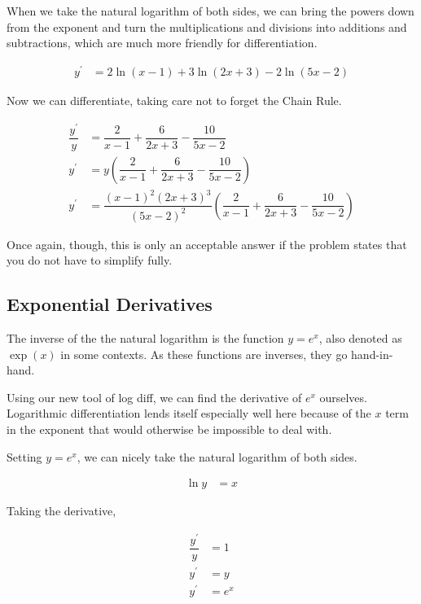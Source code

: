When we take the natural logarithm of both sides, we can bring the powers down from the exponent and turn the multiplications and divisions into additions and subtractions, which are much more friendly for differentiation.

\begin{align}
    y^\prime &= 2 \ln{\left( x - 1 \right)} + 3 \ln{\left( 2x + 3 \right)} - 2 \ln{\left( 5x - 2 \right)}
\end{align}

Now we can differentiate, taking care not to forget the Chain Rule.

\begin{align}
    \dfrac{y^\prime}{y} &= \dfrac{2}{x - 1} + \dfrac{6}{2x + 3} - \dfrac{10}{5x - 2} \\
    y^\prime &= y \left( \dfrac{2}{x - 1} + \dfrac{6}{2x + 3} - \dfrac{10}{5x - 2} \right) \\
    y^\prime &= \dfrac{\left( x - 1 \right)^2 \left( 2x + 3 \right)^3}{\left( 5x - 2 \right)^2} \left( \dfrac{2}{x - 1} + \dfrac{6}{2x + 3} - \dfrac{10}{5x - 2} \right)
\end{align}

Once again, though, this is only an acceptable answer if the problem states that you do not have to simplify fully.

\subsection{Exponential Derivatives}

The inverse of the the natural logarithm is the function \( y = e^x \), also denoted as \( \exp{\left( x \right)} \) in some contexts. As these functions are inverses, they go hand-in-hand.

Using our new tool of log diff, we can find the derivative of \( e^x \) ourselves. Logarithmic differentiation lends itself especially well here because of the \( x \) term in the exponent that would otherwise be impossible to deal with.

Setting \( y = e^x \), we can nicely take the natural logarithm of both sides.

\begin{align}
    \ln{y} &= x
\end{align}

Taking the derivative,

\begin{align}
    \dfrac{y^\prime}{y} &= 1 \\
    y^\prime &= y \\
    y^\prime &= e^x
\end{align}

